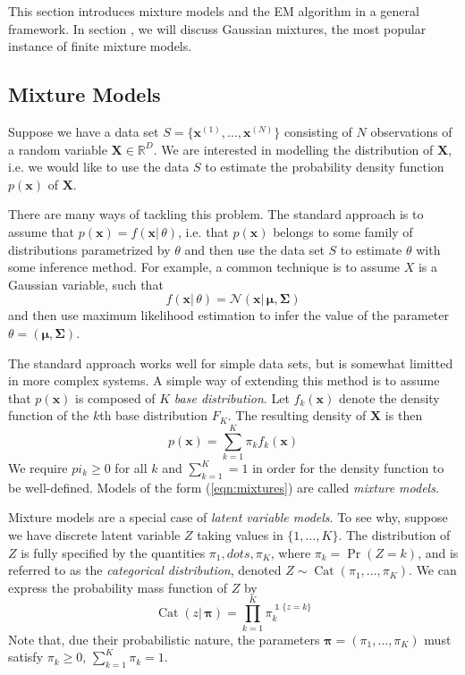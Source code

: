 \documentclass[final,3p,times,twocolumn]{elsarticle}
\DeclareMathOperator*{\Cat}{Cat}
\let\bs\boldsymbol
\DeclareMathOperator*{\id}{\mathds{1}}
\begin{document}
This section introduces mixture models and the EM algorithm in a general framework.
In section \label{sect:gmm}, we will discuss Gaussian mixtures, the most popular instance of finite mixture models.





\subsection{Mixture Models}
\label{sect:mixtures}
Suppose we have a data set $S = \{\bs x^{(1)},\dots,\bs x^{(N)}\}$ consisting of $N$ observations of a random variable $\bs X \in \mathbb{R}^D$.
We are interested in modelling the distribution of $\bs X$, i.e. we would like to use the data $S$ to estimate the probability density function $p(\bs x)$ of $\bs X$.

There are many ways of tackling this problem. 
The standard approach is to assume that $p(\bs x) = f(\bs x|\,\theta)$, i.e. that $p(\bs x)$ belongs to some family of distributions parametrized by $\theta$ and then use the data set $S$ to estimate $\theta$ with some inference method.
For example, a common technique is to assume $X$ is a Gaussian variable, such that 
\begin{equation}
f(\bs x |\,\theta) = \mathcal{N}(\bs x|\,\bs\mu,\bs \Sigma)
\end{equation}
and then use maximum likelihood estimation to infer the value of the parameter $\theta = (\bs\mu,\bs\Sigma)$.

The standard approach works well for simple data sets, but is somewhat limitted in more complex systems.
A simple way of extending this method is to assume that $p(\bs x)$ is composed of $K$ \emph{base distribution}.
Let $f_k(\bs x)$ denote the density function of the $k$th base distribution $F_K$.
The resulting density of $\bs X$ is then
\begin{equation}
\label{eqn:mixtures}
p(\bs x) = \sum_{k=1}^K \pi_k f_k(\bs x)
\end{equation}
We require $pi_k \geq 0$ for all $k$ and $\sum_{k=1}^K = 1$ in order for the density function to be well-defined.
Models of the form (\ref{eqn:mixtures}) are called \emph{mixture models}.

Mixture models are a special case of \emph{latent variable models}.
To see why, suppose we have discrete latent variable $Z$ taking values in $\{1,\dots,K\}$.
The distribution of $Z$ is fully specified by the quantities $\pi_1,dots,\pi_K$, where $\pi_k = \Pr(Z = k)$, and is referred to as the \emph{categorical distribution}, denoted $Z \sim \Cat(\pi_1, \dots,\pi_K)$.
We can express the probability mass function of $Z$ by
\begin{equation}
\label{eqn:cat}
\Cat(z|\,\bs\pi) = \prod_{k=1}^K \pi_k^{\id\{z=k\}}
\end{equation}
Note that, due their probabilistic nature, the parameters $\bs \pi = (\pi_1,\dots,\pi_K)$ must satisfy $\pi_k \geq 0$, $\sum_{k=1}^K \pi_k = 1$.
\end{document}
